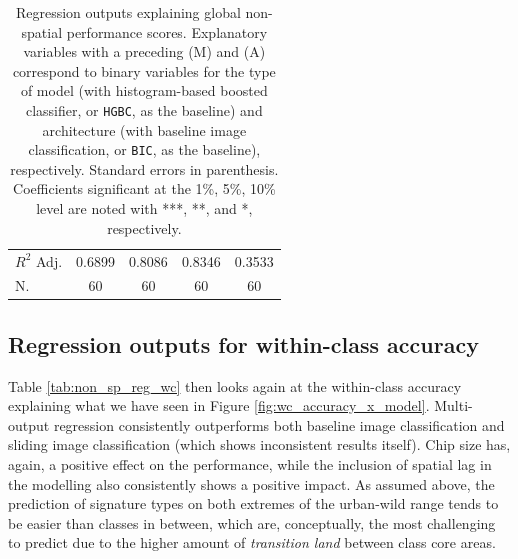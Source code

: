 \begin{table}
\begin{tabular}{lcccc}
$R^2$ Adj.                                        &     0.6899 &           0.8086 &       0.8346 &         0.3533 \\
N.                                                &     60     &           60     &       60     &         60     \\
\bottomrule
\end{tabular}
    \caption{\label{tab:non_sp_reg}\footnotesize Regression outputs explaining
            global non-spatial
    performance scores. Explanatory variables with a preceding (M) and (A)
    correspond to binary variables for the type of model (with histogram-based
            boosted classifier, or \texttt{HGBC}, as the
    baseline) and architecture (with baseline image classification, or
    \texttt{BIC}, as the baseline),
    respectively. Standard errors in parenthesis. Coefficients significant at
    the 1\%, 5\%, 10\% level are noted with ***, **, and *, respectively.}
\end{table}

\subsection*{Regression outputs for within-class accuracy}
Table \ref{tab:non_sp_reg_wc} then looks again at the within-class accuracy explaining
what we have seen in Figure \ref{fig:wc_accuracy_x_model}.
Multi-output regression consistently outperforms both baseline image classification and
sliding image classification (which shows inconsistent results itself). Chip size has,
again, a positive effect on the performance, while the inclusion of spatial
lag in the modelling also consistently shows a positive impact. As assumed above, the
prediction of signature types on both extremes of the urban-wild range tends to be
easier than classes in between, which are, conceptually, the most challenging to predict
due to the higher amount of \textit{transition land} between class core areas.

